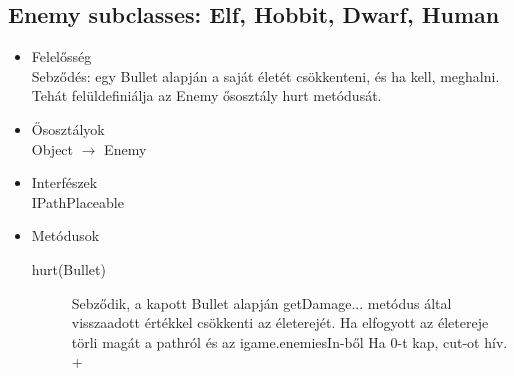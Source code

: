 \subsection{Enemy subclasses: Elf, Hobbit, Dwarf, Human}
\begin{itemize}
\item Felelősség\\
Sebződés: egy Bullet alapján a saját életét csökkenteni, és ha kell, meghalni. Tehát felüldefiniálja az Enemy ősosztály hurt metódusát.
\item Ősosztályok\\
Object $\rightarrow$ Enemy
\item Interfészek\\
IPathPlaceable

\item Metódusok\\
	\begin{description}
		\item[hurt(Bullet)] Sebződik, a kapott Bullet alapján getDamage... metódus által visszaadott értékkel csökkenti az életerejét. Ha elfogyott az életereje törli magát a pathról és az igame.enemiesIn-ből Ha 0-t kap, cut-ot hív. +
		
	\end{description}
\end{itemize}



